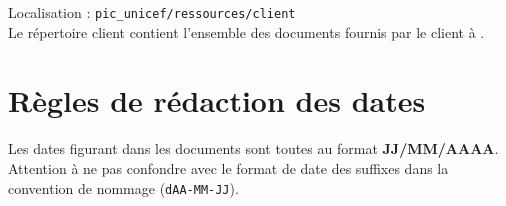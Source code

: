 Localisation : \verb+pic_unicef/ressources/client+\\

Le répertoire client contient l’ensemble des documents fournis par le client à \nomEquipe.

\section{Règles de rédaction des dates}

Les dates figurant dans les documents sont toutes au format \textbf{JJ/MM/AAAA}. Attention à ne pas confondre avec le format de date des  suffixes dans la convention de nommage (\verb+dAA-MM-JJ+).

